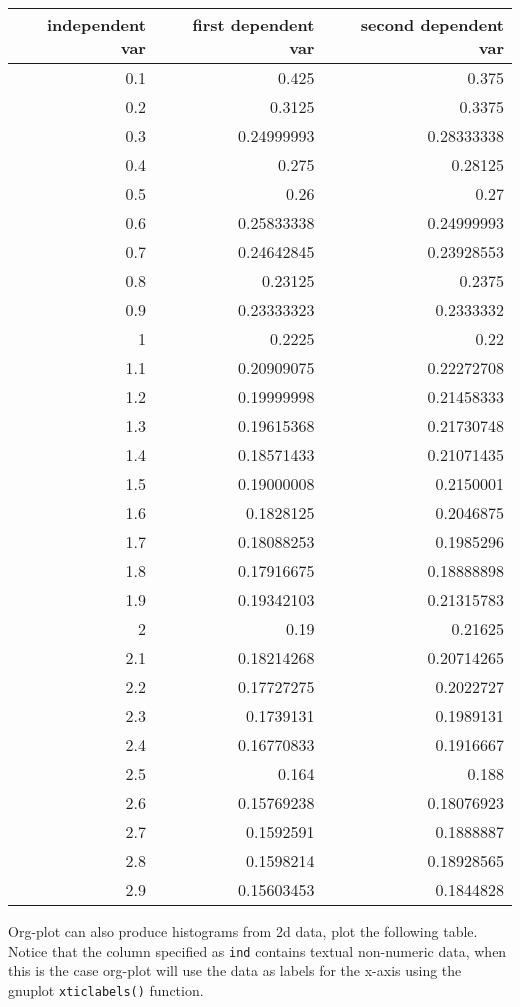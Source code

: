 \documentclass[11pt]{article}
\begin{document}
\begin{table}[htbp]
\label{tab:org5554e09}
\centering
\begin{tabular}{rrr}
independent var & first dependent var & second dependent var\\
\hline
0.1 & 0.425 & 0.375\\
0.2 & 0.3125 & 0.3375\\
0.3 & 0.24999993 & 0.28333338\\
0.4 & 0.275 & 0.28125\\
0.5 & 0.26 & 0.27\\
0.6 & 0.25833338 & 0.24999993\\
0.7 & 0.24642845 & 0.23928553\\
0.8 & 0.23125 & 0.2375\\
0.9 & 0.23333323 & 0.2333332\\
1 & 0.2225 & 0.22\\
1.1 & 0.20909075 & 0.22272708\\
1.2 & 0.19999998 & 0.21458333\\
1.3 & 0.19615368 & 0.21730748\\
1.4 & 0.18571433 & 0.21071435\\
1.5 & 0.19000008 & 0.2150001\\
1.6 & 0.1828125 & 0.2046875\\
1.7 & 0.18088253 & 0.1985296\\
1.8 & 0.17916675 & 0.18888898\\
1.9 & 0.19342103 & 0.21315783\\
2 & 0.19 & 0.21625\\
2.1 & 0.18214268 & 0.20714265\\
2.2 & 0.17727275 & 0.2022727\\
2.3 & 0.1739131 & 0.1989131\\
2.4 & 0.16770833 & 0.1916667\\
2.5 & 0.164 & 0.188\\
2.6 & 0.15769238 & 0.18076923\\
2.7 & 0.1592591 & 0.1888887\\
2.8 & 0.1598214 & 0.18928565\\
2.9 & 0.15603453 & 0.1844828\\
\end{tabular}
\end{table}


Org-plot can also produce histograms from 2d data, plot the following
table.  Notice that the column specified as \texttt{ind} contains textual
non-numeric data, when this is the case org-plot will use the data as
labels for the x-axis using the gnuplot \texttt{xticlabels()} function.
\end{document}
